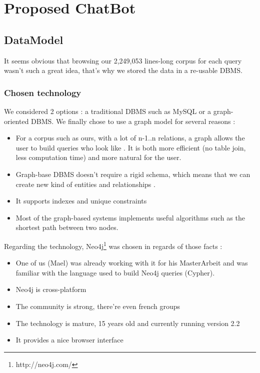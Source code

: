 \section{Proposed ChatBot}
%
\subsection{DataModel}
It seems obvious that browsing our 2,249,053 lines-long corpus for each query wasn't such a great idea, that's why we stored the data in a re-usable DBMS.
\subsubsection{Chosen technology}
We considered 2 options : a traditional DBMS such as MySQL or a graph-oriented DBMS. We finally chose to use a graph model for several reasons :
\begin{itemize}
\item For a corpus such as ours, with a lot of n-1..n relations, a graph allows the user to build queries who look like . It is both more efficient (no table join, less computation time) and more natural for the user.
\item Graph-base DBMS doesn't require a rigid schema, which means that we can create new kind of entities and relationships .
\item It supports indexes and unique constraints
\item Most of the graph-based systems implements useful algorithms such as the shortest path between two nodes.
\end{itemize}
Regarding the technology, Neo4j\footnote{http://neo4j.com/} was chosen in regards of those facts :
\begin{itemize}
\item One of us (Mael) was already working with it for his MasterArbeit and was familiar with the language used to build Neo4j queries (Cypher).
\item Neo4j is cross-platform
\item The community is strong, there're even french groups
\item The technology is mature, 15 years old and currently running version 2.2
\item It provides a nice browser interface
\end{itemize}


